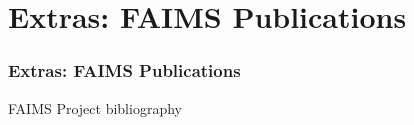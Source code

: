
\section{Extras: FAIMS Publications}

\begin{sectionframe} %
	\frametitle{Extras: FAIMS Publications}


\end{sectionframe}
\begin{frame}[allowframebreaks]{FAIMS Project bibliography}
\begin{refsegment}


\nocite{ballsun-stantonFAIMSMobileFlexible2018,rossBuildingBazaarEnhancing2015,rossCreatingEresearchTools2013a,rossIntroducingPreregistrationResearch2020,sobotkovaArbitraryOfflineData2015a,sobotkovaDeployingOfflineMultiuser2021,sobotkovaMeasureTwiceCut2016,sobotkovaSociotechnicalObstaclesArchaeological2018,thorneM436DistalFootprints2018,vanvalkenburghMobilizationMediationImplementing2018}

\printbibliography[heading=none, segment=2]

\end{refsegment}
\end{frame}
    